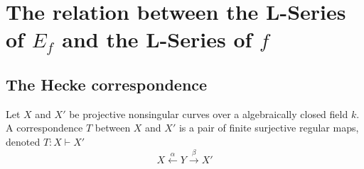 \documentclass[11pt]{article}
\begin{document}
\section{The relation between the L-Series of $E_f$ and the L-Series of $f$ }

\subsection{The Hecke correspondence}
\begin{definition}
    Let $X$ and $X'$ be projective nonsingular curves over a algebraically closed field $k$. A correspondence $T$ between $X$ and $X'$ 
    is a pair of finite surjective regular maps, denoted $T:X \vdash X' $
    \begin{equation*}
        X \stackrel{\alpha}{\longleftarrow} Y \stackrel{\beta}{\longrightarrow}X'
    \end{equation*}
\end{definition}
\end{document}
